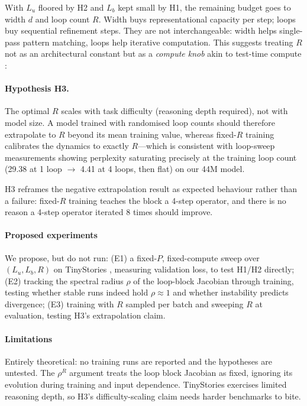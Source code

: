 With $L_u$ floored by H2 and $L_b$ kept small by H1, the remaining
budget goes to width $d$ and loop count $R$. Width buys
representational capacity per step; loops buy sequential
refinement steps. They are not interchangeable: width helps
single-pass pattern matching, loops help iterative computation.
This suggests treating $R$ not as an architectural constant but
as a \emph{compute knob} akin to test-time compute
\citep{snell2024scaling}:

\paragraph{Hypothesis H3.} The optimal $R$ scales with task
difficulty (reasoning depth required), not with model size. A
model trained with randomised loop counts should therefore
extrapolate to $R$ beyond its mean training value, whereas
fixed-$R$ training calibrates the dynamics to exactly $R$---which
is consistent with loop-sweep measurements showing perplexity
saturating precisely at the training loop count (29.38 at 1 loop
$\to$ 4.41 at 4 loops, then flat) on our 44M model.

H3 reframes the negative extrapolation result as expected
behaviour rather than a failure: fixed-$R$ training teaches the
block a 4-step operator, and there is no reason a 4-step operator
iterated 8 times should improve.

\paragraph{Proposed experiments}

We propose, but do not run: (E1) a fixed-$P$, fixed-compute sweep
over $(L_u, L_b, R)$ on TinyStories \citep{eldan2023tinystories},
measuring validation loss, to test H1/H2 directly; (E2)
tracking the spectral radius $\rho$ of the loop-block Jacobian
through training, testing whether stable runs indeed hold
$\rho \approx 1$ and whether instability predicts divergence;
(E3) training with $R$ sampled per batch and sweeping $R$ at
evaluation, testing H3's extrapolation claim.

\paragraph{Limitations}

Entirely theoretical: no training runs are reported and the
hypotheses are untested. The $\rho^R$ argument treats the loop
block Jacobian as fixed, ignoring its evolution during training
and input dependence. TinyStories exercises limited reasoning
depth, so H3's difficulty-scaling claim needs harder benchmarks
to bite.

